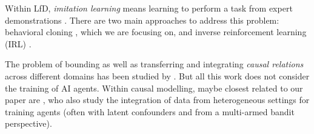 \documentclass[letterpaper]{article} %
\theoremstyle{definition}%
\theoremstyle{definition}
\newcommand{\todo}[1]{\textcolor{red}{#1}}
\begin{document}
Within LfD, \emph{imitation learning} means learning to perform a task from expert demonstrations \cite{ho2016generative,muller2006off}. 
There are two main approaches to address this problem: behavioral cloning \cite{pomerleau1991efficient}, which we are focusing on, 
and inverse reinforcement learning (IRL) \cite{ng2000algorithms,ziebart2008maximum}. %



The problem of bounding as well as transferring and integrating \emph{causal relations} across different domains has been studied by \cite{balke1994counterfactual,bareinboim2014generalizability,magliacane2017causal}. %
But all this work does not consider the training of AI agents.
Within causal modelling, maybe closest related to our paper are \cite{bareinboim2015bandits,forney2017counterfactual,zhang2017transfer,geiger2016experimental}, who also study the integration of data from heterogeneous settings for training agents (often with latent confounders and from a multi-armed bandit perspective).
\end{document}
